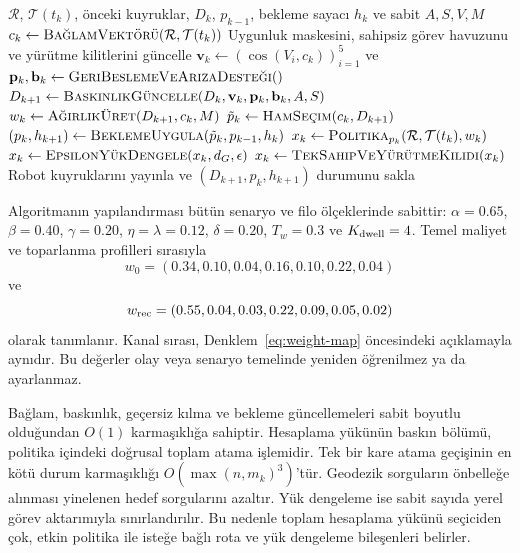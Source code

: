 \documentclass[10pt,letterpaper,onecolumn]{IEEEtran}
\begin{document}
\begin{algorithm}[t]
\caption{AHE-MRTA Olay Çevrimi}
\label{alg:ahe}
\begin{algorithmic}[1]
\REQUIRE $\mathcal R$, $\mathcal T(t_k)$, önceki kuyruklar, $D_k$,
         $p_{k-1}$, bekleme sayacı $h_k$ ve sabit $A,S,V,M$
\STATE $c_k\gets\textsc{BağlamVektörü}(\mathcal R,\mathcal T(t_k))$
\STATE Uygunluk maskesini, sahipsiz görev havuzunu ve yürütme kilitlerini güncelle
\STATE $\mathbf v_k\gets(\cos(V_i,c_k))_{i=1}^{5}$ ve
       $\mathbf p_k,\mathbf b_k\gets\textsc{GeriBeslemeVeArızaDesteği}()$
\STATE $D_{k+1}\gets\textsc{BaskınlıkGüncelle}(D_k,\mathbf v_k,
       \mathbf p_k,\mathbf b_k,A,S)$ \hfill {}
\STATE $w_k\gets\textsc{AğırlıkÜret}(D_{k+1},c_k,M)$
       \hfill {}
\STATE $\tilde p_k\gets\textsc{HamSeçim}(c_k,D_{k+1})$
       \hfill {}
\STATE $(p_k,h_{k+1})\gets\textsc{BeklemeUygula}(\tilde p_k,p_{k-1},h_k)$
\STATE $x_k\gets\textsc{Politika}_{p_k}(\mathcal R,\mathcal T(t_k),w_k)$
       \hfill {}
  \STATE $x_k\gets\textsc{EpsilonYükDengele}(x_k,d_G,\epsilon)$
\ENDIF
\STATE $x_k\gets\textsc{TekSahipVeYürütmeKilidi}(x_k)$
\STATE Robot kuyruklarını yayınla ve $(D_{k+1},p_k,h_{k+1})$ durumunu sakla
\end{algorithmic}
\end{algorithm}

\label{sec:method-config}

Algoritmanın yapılandırması bütün senaryo ve filo ölçeklerinde sabittir:
$\alpha=0.65$, $\beta=0.40$, $\gamma=0.20$,
$\eta=\lambda=0.12$, $\delta=0.20$, $T_w=0.3$ ve $K_{\rm dwell}=4$.
Temel maliyet ve toparlanma profilleri sırasıyla
\[
w_0=(0.34,0.10,0.04,0.16,0.10,0.22,0.04)
\]
ve
\[
w_{\rm rec}=(0.55,0.04,0.03,0.22,0.09,0.05,0.02)
\]
olarak tanımlanır. Kanal sırası, Denklem~\eqref{eq:weight-map} öncesindeki
açıklamayla aynıdır. Bu değerler olay veya senaryo temelinde yeniden öğrenilmez
ya da ayarlanmaz.

Bağlam, baskınlık, geçersiz kılma ve bekleme güncellemeleri sabit boyutlu
olduğundan $O(1)$ karmaşıklığa sahiptir. Hesaplama yükünün baskın bölümü,
politika içindeki doğrusal toplam atama işlemidir. Tek bir kare atama geçişinin
en kötü durum karmaşıklığı
$O\!\left(\max(n,m_k)^3\right)$'tür. Geodezik sorguların
önbelleğe alınması yinelenen hedef sorgularını azaltır. Yük dengeleme ise sabit
sayıda yerel görev aktarımıyla sınırlandırılır. Bu nedenle toplam hesaplama
yükünü seçiciden çok, etkin politika ile isteğe bağlı rota ve yük dengeleme
bileşenleri belirler.
\end{document}
